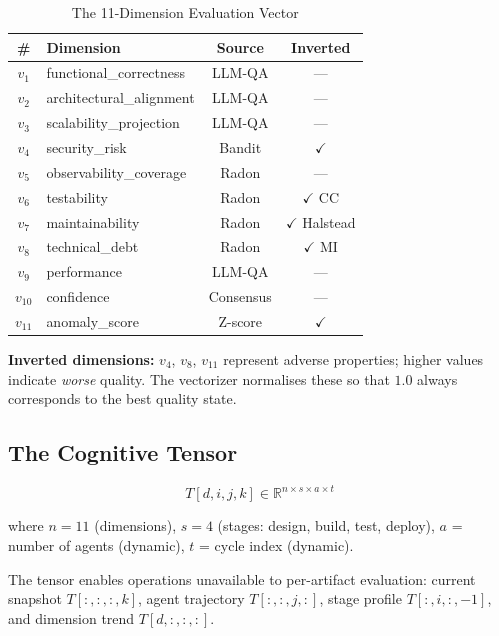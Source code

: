 \documentclass[manuscript,review,anonymous]{acmart}
\begin{document}
\begin{table}[t]
  \caption{The 11-Dimension Evaluation Vector}
  \label{tab:vector}
  \begin{tabular}{clcc}
    \toprule
    \# & Dimension & Source & Inverted \\
    \midrule
    $v_1$ & functional\_correctness & LLM-QA & --- \\
    $v_2$ & architectural\_alignment & LLM-QA & --- \\
    $v_3$ & scalability\_projection & LLM-QA & --- \\
    $v_4$ & security\_risk & Bandit & $\checkmark$ \\
    $v_5$ & observability\_coverage & Radon & --- \\
    $v_6$ & testability & Radon & $\checkmark$ CC \\
    $v_7$ & maintainability & Radon & $\checkmark$ Halstead \\
    $v_8$ & technical\_debt & Radon & $\checkmark$ MI \\
    $v_9$ & performance & LLM-QA & --- \\
    $v_{10}$ & confidence & Consensus & --- \\
    $v_{11}$ & anomaly\_score & Z-score & $\checkmark$ \\
    \bottomrule
  \end{tabular}
\end{table}

\noindent \textbf{Inverted dimensions:} $v_4$, $v_8$, $v_{11}$ represent adverse
properties; higher values indicate \textit{worse} quality. The vectorizer normalises
these so that $1.0$ always corresponds to the best quality state.

\subsection{The Cognitive Tensor}

\begin{equation}
  T[d, i, j, k] \in \mathbb{R}^{n \times s \times a \times t}
\end{equation}

where $n = 11$ (dimensions), $s = 4$ (stages: design, build, test, deploy),
$a$ = number of agents (dynamic), $t$ = cycle index (dynamic).

The tensor enables operations unavailable to per-artifact evaluation: current
snapshot $T[:,:,:,k]$, agent trajectory $T[:,:,j,:]$, stage profile $T[:,i,:,-1]$,
and dimension trend $T[d,:,:,:]$.
\end{document}
